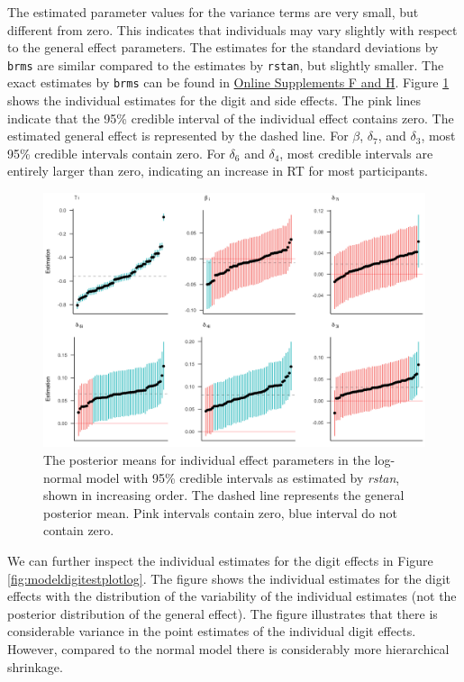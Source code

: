 \documentclass[
  english,
  doc,floatsintext]{apa6}
\begin{document}
The estimated parameter values for the variance terms are very small, but different from zero. This indicates that individuals may vary slightly with respect to the general effect parameters. The estimates for the standard deviations by \texttt{brms} are similar compared to the estimates by \texttt{rstan}, but slightly smaller. The exact estimates by \texttt{brms} can be found in \href{https://github.com/MyrtheV/Bayesian-Hierarchical-Modelling-An-Introduction-and-Reassessment}{Online Supplements F and H}.
Figure \ref{fig:randomparplotlog} shows the individual estimates for the digit and side effects. The pink lines indicate that the 95\% credible interval of the individual effect contains zero. The estimated general effect is represented by the dashed line. For \(\beta\), \(\delta_{7}\), and \(\delta_{3}\), most 95\% credible intervals contain zero. For \(\delta_{6}\) and \(\delta_{4}\), most credible intervals are entirely larger than zero, indicating an increase in RT for most participants.

\begin{figure}[H]

\includegraphics[width=1\linewidth]{Images/Fig14_randomparlog_v2} \hfill{}

\caption{The posterior means for individual effect parameters in the log-normal model with 95\% credible intervals as estimated by \textit{rstan}, shown in increasing order. The dashed line represents the general posterior mean. Pink intervals contain zero, blue interval do not contain zero.}\label{fig:randomparplotlog}
\end{figure}

We can further inspect the individual estimates for the digit effects in Figure \ref{fig:modeldigitestplotlog}. The figure shows the individual estimates for the digit effects with the distribution of the variability of the individual estimates (not the posterior distribution of the general effect). The figure illustrates that there is considerable variance in the point estimates of the individual digit effects. However, compared to the normal model there is considerably more hierarchical shrinkage.
\end{document}
